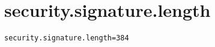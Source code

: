 \section{security.signature.length}
\label{configuration:SecuritySignatureLength}
\AvailableInJavaOnly{\TODO}
\begin{lstlisting}[style=Props,caption={Usage example for \textit{security.signature.length}}]
security.signature.length=384
\end{lstlisting}